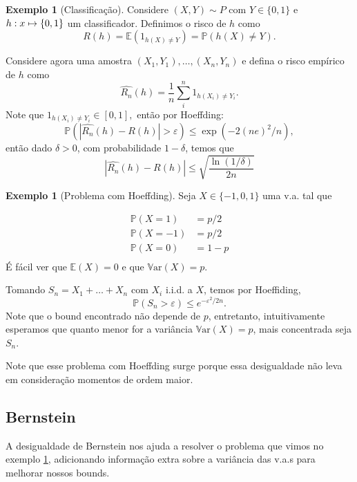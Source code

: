 \documentclass[12pt,a4paper,oneside]{book}
\theoremstyle{definition}
\newtheorem{example}[theorem]{Exemplo}
\theoremstyle{remark}
\numberwithin{equation}{section}
\newcommand{\e}{\varepsilon}
\newcommand{\E}{\mathbb{E}}
\newcommand{\pr}{\mathbb{P}}
\newcommand{\Var}{\mathbb{V}\text{ar}}
\begin{document}
\begin{tcolorbox}
\begin{example}[Classificação] Considere $(X,Y)\sim P$ com $Y\in\{0,1\}$ e $\\h:x\mapsto \{0,1\}$ um classificador.
Definimos o risco de $h$ como
$$R(h) = \E(1_{h(X)\neq Y}) = \pr(h(X)\neq Y). $$

Considere agora uma amostra $(X_1,Y_1),\dots,(X_n,Y_n)$ e defina o risco empírico de $h$ como 
$$\hat{R_n}(h) = \dfrac{1}{n}\sum_i^n 1_{h(X_i)\neq Y_i}.  $$
Note que $1_{h(X_i)\neq Y_i}\in[0,1],$ então por Hoeffding:
$$\pr(|\hat{R_n}(h)-R(h)|>\e)\leq  \exp(-2(ne)^2/n), $$
então dado $\delta>0$, com probabilidade $1-\delta$, temos que
$$|\hat{R_n}(h)-R(h)| \leq \sqrt{\dfrac{\ln(1/\delta)}{2n}}  $$
\end{example}
\end{tcolorbox}




\begin{tcolorbox}
\begin{example}[Problema com Hoeffding]\label{exemplo-prob-hoef} Seja $X\in\{-1,0,1\}$ uma v.a. tal que 

$$
\begin{array}{llr}
\pr(X=1) &= p/2 \\
\pr(X=-1) &= p/2 \\
 \pr(X=0) &= 1 -p\\
\end{array}
$$
É fácil ver que $\E(X)=0$ e que $\Var(X) = p.$ 

Tomando $S_n = X_1+\dots+X_n$ com $X_i$ i.i.d. a $X$, temos por Hoeffiding,
$$\pr(S_n>\e)\leq e^{-\e^2/2n}.$$
Note que o bound encontrado não depende de $p$, entretanto, intuitivamente esperamos que quanto menor for a variância $\Var(X) = p$, mais concentrada seja $S_n$. 

Note que esse problema com Hoeffding surge porque essa desigualdade não leva em consideração momentos de ordem maior.
\end{example}
\end{tcolorbox}


\subsection{Bernstein} 
A desigualdade de Bernstein nos ajuda a resolver o problema que vimos no exemplo \ref{exemplo-prob-hoef}, adicionando informação extra sobre a variância das v.a.s para melhorar nossos bounds. 
\end{document}

